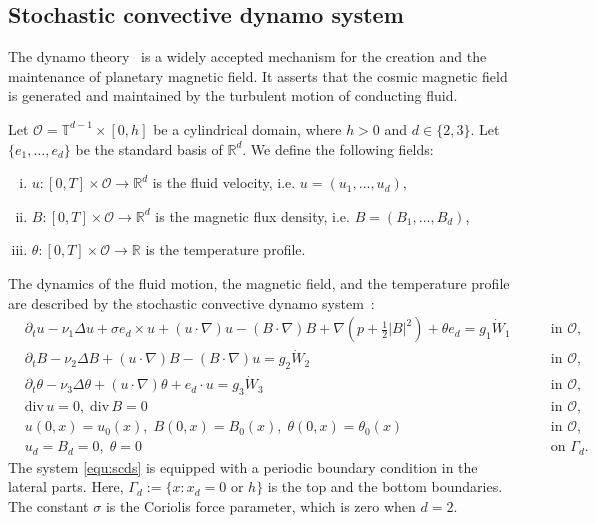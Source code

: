 \documentclass[11pt, reqno]{amsart}
\theoremstyle{definition}
\numberwithin{equation}{section}
\newcommand{\bb}{\mathbb}
\newcommand{\divg}{\mathrm{div}\,}
\newcommand{\abs}[1]{\left|{#1}\right|}
\begin{document}
\subsection{Stochastic convective dynamo system}\label{sec:dynamo}

The dynamo theory~\cite{Els56} is a widely accepted mechanism for the creation and the maintenance of planetary magnetic field. It asserts that the cosmic magnetic field is generated and maintained by the turbulent motion of conducting fluid. 

Let $\mathscr{O}= \bb{T}^{d-1}\times [0,h]$ be a cylindrical domain, where $h>0$ and $d\in \{2,3\}$. Let $\{e_1,\ldots,e_d\}$ be the standard basis of $\bb{R}^d$. We define the following fields:
\begin{enumerate}[(i)]
    \item $u:[0,T]\times \mathscr{O}\to \bb{R}^d$ is the fluid velocity, i.e. $u=(u_1,\ldots,u_d)$,
    \item $B: [0,T]\times \mathscr{O}\to \bb{R}^d$ is the magnetic flux density, i.e. $B=(B_1,\ldots,B_d)$,
    \item $\theta :[0,T] \times \mathscr{O} \to \bb{R}$ is the temperature profile.
\end{enumerate}
The dynamics of the fluid motion, the magnetic field, and the temperature profile are described by the stochastic convective dynamo system~\cite{CatEmoWei03, CatHug06, Tob21}:
\begin{subequations}\label{equ:scds}
	\begin{alignat}{2}
		&\partial_t u - \nu_1 \Delta u + \sigma e_d \times u + (u\cdot\nabla)u - (B\cdot\nabla) B + \nabla \left(p+\frac12 \abs{B}^2\right) + \theta e_d = g_1 \dot{W}_1
		\; && \quad\text{in $\mathscr{O}$,}
		\label{equ:scds a1}
		\\[1ex]
        &\partial_t B - \nu_2 \Delta B + (u\cdot\nabla)B - (B\cdot\nabla)u = g_2 \dot{W}_2
		\; && \quad\text{in $\mathscr{O}$,}
		\label{equ:scds a2}
		\\[1ex]
        \label{equ:scds a3}
        &\partial_t \theta - \nu_3 \Delta \theta + (u\cdot\nabla)\theta + e_d\cdot u = g_3 \dot{W}_3
        \; && \quad\text{in $\mathscr{O}$,}
        \\[1ex]
		&\divg u = 0,\; \divg B=0
		\; && \quad\text{in $\mathscr{O}$,}
		\label{equ:scds b}
		\\[1ex]
		&u(0,x)= u_0(x) ,\; B(0,x)=B_0(x), \; \theta(0,x)=\theta_0(x)
		\; && \quad\text{in $\mathscr{O}$,}
		\label{equ:scds c}
		\\[1ex]
		&u_d=B_d=0,\; \theta=0
		\; && \quad\text{on $\Gamma_d$.}
		\label{equ:scds d}
	\end{alignat}
\end{subequations}
The system \eqref{equ:scds} is equipped with a periodic boundary condition in the lateral parts. Here, $\Gamma_d:= \{x: x_d=0 \text{ or } h\}$ is the top and the bottom boundaries. The constant $\sigma$ is the Coriolis force parameter, which is zero when $d=2$.
\end{document}
